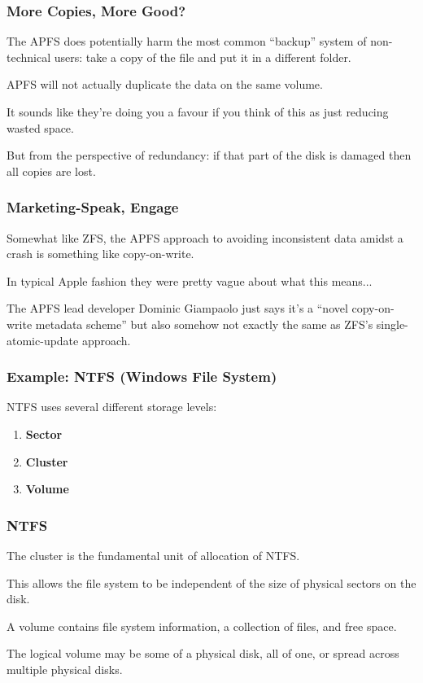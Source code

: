 \begin{frame}
\frametitle{More Copies, More Good?}

The APFS does potentially harm the most common ``backup'' system of non-technical users: take a copy of the file and put it in a different folder.

APFS will not actually duplicate the data on the same volume.

It sounds like they're doing you a favour if you think of this as just reducing wasted space.

But from the perspective of redundancy: if that part of the disk is damaged then all copies are lost.

\end{frame}

\begin{frame}
\frametitle{Marketing-Speak, Engage}

Somewhat like ZFS, the APFS approach to avoiding inconsistent data amidst a crash is something like copy-on-write. 

In typical Apple fashion they were pretty vague about what this means...

The APFS lead developer Dominic Giampaolo just says it's a ``novel copy-on-write metadata scheme'' but also somehow not exactly the same as ZFS's single-atomic-update approach.

\end{frame}


\begin{frame}
\frametitle{Example: NTFS (Windows File System)}

NTFS uses several different storage levels:

\begin{enumerate}
	\item \textbf{Sector}
	\item \textbf{Cluster}
	\item \textbf{Volume}
\end{enumerate}


\end{frame}

\begin{frame}
\frametitle{NTFS}

The cluster is the fundamental unit of allocation of NTFS.

This allows the file system to be independent of the size of physical sectors on the disk. 

A volume contains file system information, a collection of files, and free space. 

The logical volume may be some of a physical disk, all of one, or spread across multiple physical disks.

\end{frame}

